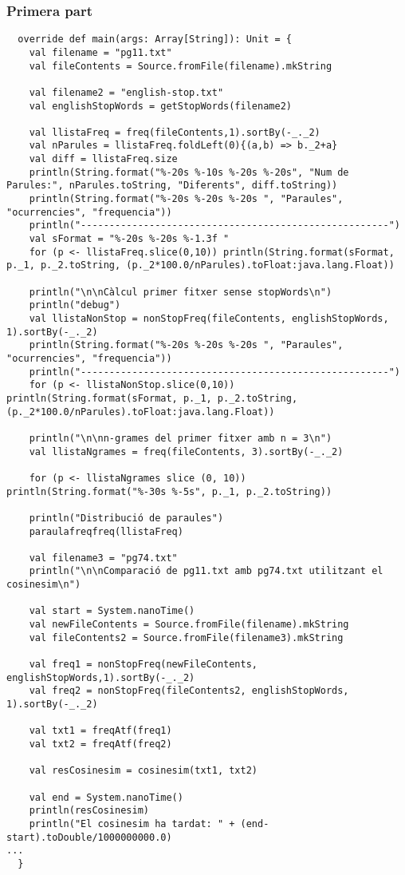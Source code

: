 \documentclass[11pt,a4paper,twoside]{report}
\begin{document}
\subsubsection{Primera part}

\begin{lstlisting}
  override def main(args: Array[String]): Unit = {
    val filename = "pg11.txt"
    val fileContents = Source.fromFile(filename).mkString

    val filename2 = "english-stop.txt"
    val englishStopWords = getStopWords(filename2)

    val llistaFreq = freq(fileContents,1).sortBy(-_._2)
    val nParules = llistaFreq.foldLeft(0){(a,b) => b._2+a}
    val diff = llistaFreq.size
    println(String.format("%-20s %-10s %-20s %-20s", "Num de Parules:", nParules.toString, "Diferents", diff.toString))
    println(String.format("%-20s %-20s %-20s ", "Paraules", "ocurrencies", "frequencia"))
    println("------------------------------------------------------")
    val sFormat = "%-20s %-20s %-1.3f "
    for (p <- llistaFreq.slice(0,10)) println(String.format(sFormat, p._1, p._2.toString, (p._2*100.0/nParules).toFloat:java.lang.Float))

    println("\n\nCàlcul primer fitxer sense stopWords\n")
    println("debug")
    val llistaNonStop = nonStopFreq(fileContents, englishStopWords, 1).sortBy(-_._2)
    println(String.format("%-20s %-20s %-20s ", "Paraules", "ocurrencies", "frequencia"))
    println("------------------------------------------------------")
    for (p <- llistaNonStop.slice(0,10)) println(String.format(sFormat, p._1, p._2.toString, (p._2*100.0/nParules).toFloat:java.lang.Float))

    println("\n\nn-grames del primer fitxer amb n = 3\n")
    val llistaNgrames = freq(fileContents, 3).sortBy(-_._2)

    for (p <- llistaNgrames slice (0, 10)) println(String.format("%-30s %-5s", p._1, p._2.toString))

    println("Distribució de paraules")
    paraulafreqfreq(llistaFreq)

    val filename3 = "pg74.txt"
    println("\n\nComparació de pg11.txt amb pg74.txt utilitzant el cosinesim\n")

    val start = System.nanoTime()
    val newFileContents = Source.fromFile(filename).mkString
    val fileContents2 = Source.fromFile(filename3).mkString

    val freq1 = nonStopFreq(newFileContents, englishStopWords,1).sortBy(-_._2)
    val freq2 = nonStopFreq(fileContents2, englishStopWords, 1).sortBy(-_._2)

    val txt1 = freqAtf(freq1)
    val txt2 = freqAtf(freq2)

    val resCosinesim = cosinesim(txt1, txt2)

    val end = System.nanoTime()
    println(resCosinesim)
    println("El cosinesim ha tardat: " + (end-start).toDouble/1000000000.0)
...
  }
\end{lstlisting}
\end{document}
